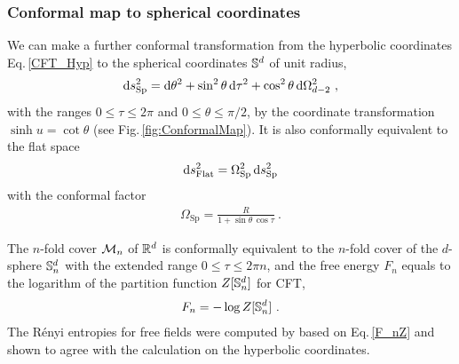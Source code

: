 \subsubsection{Conformal map to spherical coordinates}
We can make a further conformal transformation from the hyperbolic coordinates
 Eq.\,\eqref{CFT_Hyp} to the spherical coordinates $\mathbb{S}^{d}$ of unit radius,
\begin{align}\label{CFT_Sphere}
\mathrm{d} s^2_\text{Sp} = \mathrm{d}\theta^2 + \sin^2 \theta\, \mathrm{d}\tau^2 + \cos^2\theta\, \mathrm{d}\Omega_{d-2}^2 \ ,
\end{align}
with the ranges $0\le \tau \le 2\pi$ and $0\le \theta \le \pi/2$,
by the coordinate transformation $\sinh u = \cot\theta$ (see Fig.\,\ref{fig:ConformalMap}).
It is also conformally equivalent to the flat space
\begin{align}
	 \mathrm{d} s^2_\text{Flat} = \Omega^2_\text{Sp}\,\mathrm{d} s^2_\text{Sp}
\end{align}
with the conformal factor
\begin{align}
	\Omega_\text{Sp}= \frac{R}{1 + \sin\theta\, \cos\tau} \ .
\end{align}

The $n$-fold cover ${\cal M}_n$ of $\mathbb{R}^d$ is conformally equivalent to the $n$-fold cover of the $d$-sphere $\mathbb{S}_n^d$ with the extended range $0\le \tau \le 2\pi n$, and 
the free energy $F_n$ equals to the logarithm of the partition function $Z[\mathbb{S}^d_n]$ for CFT,
\begin{align}\label{F_nZ}
F_n = -\log Z[\mathbb{S}^d_n] \ .
\end{align}
The R{\'e}nyi entropies for free fields were computed by \textcite{Klebanov:2011uf}
based on  Eq.\,\eqref{F_nZ} and shown to agree with the calculation on the hyperbolic coordinates.


